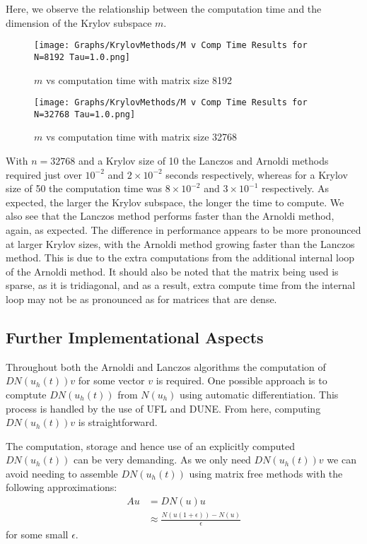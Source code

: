 Here, we observe the relationship between the computation time and the dimension of the Krylov subspace $m$.
\begin{figure}[H]
    \centering
    \begin{minipage}{0.49\textwidth}
        \texttt{[image: Graphs/KrylovMethods/M v Comp Time Results for N=8192 Tau=1.0.png]} %
        \caption{$m$ vs computation time with matrix size 8192}
        \label{fig:mCTKrylov1}
    \end{minipage}\hfill
    \centering
    \begin{minipage}{0.49\textwidth}
        \texttt{[image: Graphs/KrylovMethods/M v Comp Time Results for N=32768 Tau=1.0.png]} %
        \caption{$m$ vs computation time with matrix size 32768}
        \label{fig:mCTKrylov2}
    \end{minipage}\hfill
\end{figure}
With $n=32768$ and a Krylov size of 10 the Lanczos and Arnoldi methods required just over $10^{-2}$ and $2\times 10^{-2}$ seconds respectively,
whereas for a Krylov size of 50 the computation time was $8\times 10^{-2}$ and $3\times 10^{-1}$ respectively.
As expected, the larger the Krylov subspace, the longer the time to compute.
We also see that the Lanczos method performs faster than the Arnoldi method, again, as expected.
The difference in performance appears to be more pronounced at larger Krylov sizes, with the Arnoldi method growing faster than the Lanczos method.
This is due to the extra computations from the additional internal loop of the Arnoldi method.
It should also be noted that the matrix being used is sparse, as it is tridiagonal, and as a result, extra compute time from the internal loop may not be as pronounced as for matrices that are dense.

\subsection{Further Implementational Aspects}
Throughout both the Arnoldi and Lanczos algorithms the computation of $DN(u_h(t))v$ for some vector $v$ is required.
One possible approach is to comptute $DN(u_h(t))$ from $N(u_h)$ using automatic differentiation.
This process is handled by the use of UFL\cite{Alnaes2014} and DUNE\cite{Bastian2021}.
From here, computing $DN(u_h(t))v$ is straightforward.

The computation, storage and hence use of an explicitly computed $DN(u_h(t))$ can be very demanding.
As we only need $DN(u_h(t))v$ we can avoid needing to assemble $DN(u_h(t))$ using matrix free methods with the following approximations:
\begin{align*}
    Au &= DN(u)u\\
    &\approx \frac{N(u(1+\epsilon))-N(u)}{\epsilon}
\end{align*}
for some small $\epsilon$.